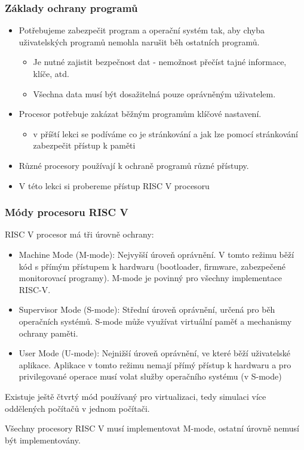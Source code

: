 \documentclass{beamer}
\begin{document}
\begin{frame}
\frametitle{Základy ochrany programů}

\begin{itemize}
\item Potřebujeme zabezpečit program a operační systém tak, aby chyba uživatelských programů nemohla narušit běh ostatních programů.
\begin{itemize}
\item Je nutné zajistit bezpečnost dat - nemožnost přečíst tajné informace, klíče, atd.
\item Všechna data musí být dosažitelná pouze oprávněným uživatelem.
\end{itemize}
\item Procesor potřebuje zakázat běžným programům klíčové nastavení.
\begin{itemize}
\item v příští lekci se podíváme co je stránkování a jak lze pomocí stránkování zabezpečit přístup k paměti
\end{itemize}
\item Různé procesory používají k ochraně programů různé přístupy.
\item V této lekci si probereme přístup RISC V procesoru
\end{itemize}
\end{frame}


\begin{frame}
\frametitle{Módy procesoru RISC V}

RISC V procesor má tři úrovně ochrany:
\begin{itemize}
\item Machine Mode (M-mode): Nejvyšší úroveň oprávnění. V tomto režimu běží kód s přímým přístupem k hardwaru (bootloader, firmware, zabezpečené monitorovací programy). M-mode je povinný pro všechny implementace RISC-V.
\item  Supervisor Mode (S-mode): Střední úroveň oprávnění, určená pro běh operačních systémů. S-mode může využívat virtuální paměť a mechanismy ochrany paměti.
\item User Mode (U-mode): Nejnižší úroveň oprávnění, ve které běží uživatelské aplikace. Aplikace v tomto režimu nemají přímý přístup k hardwaru a pro privilegované operace musí volat služby operačního systému (v S-mode)
\end{itemize}

Existuje ještě čtvrtý mód používaný pro virtualizaci, tedy simulaci více oddělených počítačů v jednom počítači.

Všechny procesory RISC V musí implementovat M-mode, ostatní úrovně nemusí být implementovány.
\end{frame}
\end{document}
